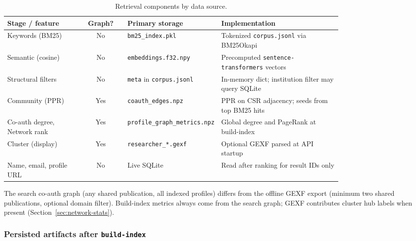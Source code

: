 \documentclass{article}
\begin{document}
\begin{table}[htbp]
  \centering
  \caption{Retrieval components by data source.}
  \label{tab:graph-vs-text}
  \small
  \begin{tabular}{@{}p{0.22\linewidth}cp{0.22\linewidth}p{0.36\linewidth}@{}}
    \toprule
    Stage / feature & Graph? & Primary storage & Implementation \\
    \midrule
    Keywords (BM25) & No & \texttt{bm25\_index.pkl} & Tokenized \texttt{corpus.jsonl} via BM25Okapi \\
    Semantic (cosine) & No & \texttt{embeddings.f32.npy} & Precomputed \texttt{sentence-transformers} vectors \\
    Structural filters & No & \texttt{meta} in \texttt{corpus.jsonl} & In-memory dict; institution filter may query SQLite \\
    Community (PPR) & Yes & \texttt{coauth\_edges.npz} & PPR on CSR adjacency; seeds from top BM25 hits \\
    Co-auth degree, Network rank & Yes & \texttt{profile\_graph\_metrics.npz} & Global degree and PageRank at build-index \\
    Cluster (display) & Yes & \texttt{researcher\_*.gexf} & Optional GEXF parsed at API startup \\
    Name, email, profile URL & No & Live SQLite & Read after ranking for result IDs only \\
    \bottomrule
  \end{tabular}
\end{table}

The search co-auth graph (any shared publication, all indexed profiles) differs from the offline GEXF export (minimum two shared publications, optional domain filter). Build-index metrics always come from the search graph; GEXF contributes cluster hub labels when present (Section~\ref{sec:network-stats}).

\subsubsection{Persisted artifacts after \texttt{build-index}}
\end{document}
